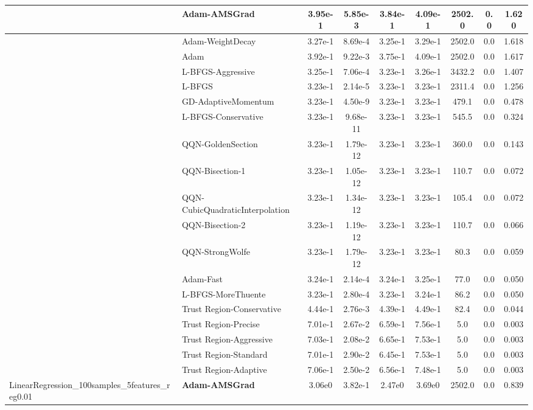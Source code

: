 \documentclass[10pt]{article}
\begin{document}
\begin{longtable}{|l|l|c|c|c|c|c|c|c|}
\hline
 & Adam-AMSGrad & 3.95e-1 & 5.85e-3 & 3.84e-1 & 4.09e-1 & 2502.0 & 0.0 & 1.620 \\
\hline
 & Adam-WeightDecay & 3.27e-1 & 8.69e-4 & 3.25e-1 & 3.29e-1 & 2502.0 & 0.0 & 1.618 \\
\hline
 & Adam & 3.92e-1 & 9.22e-3 & 3.75e-1 & 4.09e-1 & 2502.0 & 0.0 & 1.617 \\
\hline
 & L-BFGS-Aggressive & 3.25e-1 & 7.06e-4 & 3.23e-1 & 3.26e-1 & 3432.2 & 0.0 & 1.407 \\
\hline
 & L-BFGS & 3.23e-1 & 2.14e-5 & 3.23e-1 & 3.23e-1 & 2311.4 & 0.0 & 1.256 \\
\hline
 & GD-AdaptiveMomentum & 3.23e-1 & 4.50e-9 & 3.23e-1 & 3.23e-1 & 479.1 & 0.0 & 0.478 \\
\hline
 & L-BFGS-Conservative & 3.23e-1 & 9.68e-11 & 3.23e-1 & 3.23e-1 & 545.5 & 0.0 & 0.324 \\
\hline
 & QQN-GoldenSection & 3.23e-1 & 1.79e-12 & 3.23e-1 & 3.23e-1 & 360.0 & 0.0 & 0.143 \\
\hline
 & QQN-Bisection-1 & 3.23e-1 & 1.05e-12 & 3.23e-1 & 3.23e-1 & 110.7 & 0.0 & 0.072 \\
\hline
 & QQN-CubicQuadraticInterpolation & 3.23e-1 & 1.34e-12 & 3.23e-1 & 3.23e-1 & 105.4 & 0.0 & 0.072 \\
\hline
 & QQN-Bisection-2 & 3.23e-1 & 1.19e-12 & 3.23e-1 & 3.23e-1 & 110.7 & 0.0 & 0.066 \\
\hline
 & QQN-StrongWolfe & 3.23e-1 & 1.79e-12 & 3.23e-1 & 3.23e-1 & 80.3 & 0.0 & 0.059 \\
\hline
 & Adam-Fast & 3.24e-1 & 2.14e-4 & 3.24e-1 & 3.25e-1 & 77.0 & 0.0 & 0.050 \\
\hline
 & L-BFGS-MoreThuente & 3.23e-1 & 2.80e-4 & 3.23e-1 & 3.24e-1 & 86.2 & 0.0 & 0.050 \\
\hline
 & Trust Region-Conservative & 4.44e-1 & 2.76e-3 & 4.39e-1 & 4.49e-1 & 82.4 & 0.0 & 0.044 \\
\hline
 & Trust Region-Precise & 7.01e-1 & 2.67e-2 & 6.59e-1 & 7.56e-1 & 5.0 & 0.0 & 0.003 \\
\hline
 & Trust Region-Aggressive & 7.03e-1 & 2.08e-2 & 6.65e-1 & 7.53e-1 & 5.0 & 0.0 & 0.003 \\
\hline
 & Trust Region-Standard & 7.01e-1 & 2.90e-2 & 6.45e-1 & 7.53e-1 & 5.0 & 0.0 & 0.003 \\
\hline
 & Trust Region-Adaptive & 7.06e-1 & 2.50e-2 & 6.56e-1 & 7.48e-1 & 5.0 & 0.0 & 0.003 \\
LinearRegression\_100samples\_5features\_reg0.01 & \textbf{Adam-AMSGrad} & 3.06e0 & 3.82e-1 & 2.47e0 & 3.69e0 & 2502.0 & 0.0 & 0.839 \\

\end{longtable}
\end{document}
